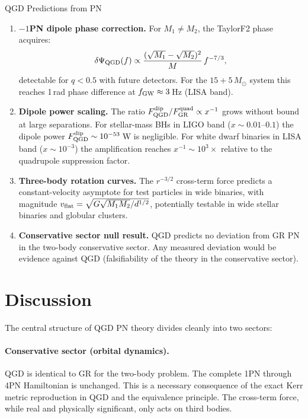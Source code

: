 \documentclass[11pt,a4paper]{article}
\newcommand{\Ms}{M_\odot}
\newcommand{\Fp}{F_{\rm QGD}^{\rm dip}}
\newcommand{\Fq}{F_{\rm GR}^{\rm quad}}
\theoremstyle{definition}
\theoremstyle{remark}
\begin{document}
	QGD Predictions from PN 
		\begin{enumerate}
			\item[\textbf{P-PN1}] \textbf{$-1$PN dipole phase correction.}
			For $M_1\neq M_2$, the TaylorF2 phase acquires:
			\[
			\delta\Psi_{\rm QGD}(f)
			\propto \frac{(\sqrt{M_1}-\sqrt{M_2})^2}{M}\,f^{-7/3},
			\]
			detectable for $q<0.5$ with future detectors. For the
			$15+5\,\Ms$ system this reaches 1\,rad phase difference at
			$f_{\rm GW}\approx3$\,Hz (LISA band).
			
			\item[\textbf{P-PN2}] \textbf{Dipole power scaling.}
			The ratio $\Fp/\Fq\propto x^{-1}$ grows without bound at large
			separations.  For stellar-mass BHs in LIGO band ($x\sim0.01$--$0.1$)
			the dipole power $\Fp\sim10^{-53}$\,W is negligible.  For
			white dwarf binaries in LISA band ($x\sim10^{-3}$) the
			amplification reaches $x^{-1}\sim10^3\times$ relative to the
			quadrupole suppression factor.
			
			\item[\textbf{P-PN3}] \textbf{Three-body rotation curves.}
			The $r^{-3/2}$ cross-term force predicts a constant-velocity
			asymptote for test particles in wide binaries, with magnitude
			$v_{\rm flat}=\sqrt{G\sqrt{M_1 M_2}/d^{1/2}}$, potentially
			testable in wide stellar binaries and globular clusters.
			
			\item[\textbf{P-PN4}] \textbf{Conservative sector null result.}
			QGD predicts no deviation from GR PN in the two-body conservative
			sector.  Any measured deviation would be evidence against QGD
			(falsifiability of the theory in the conservative sector).
		\end{enumerate}
	
	\section{Discussion}
	\label{sec:discussion}
	
	The central structure of QGD PN theory divides cleanly into two sectors:
	
	\paragraph{Conservative sector (orbital dynamics).}
	QGD is identical to GR for the two-body problem.  The complete 1PN
	through 4PN Hamiltonian is unchanged.  This is a necessary consequence
	of the exact Kerr metric reproduction in QGD and the equivalence
	principle.  The cross-term force, while real and physically
	significant, only acts on third bodies.
	
\end{document}
